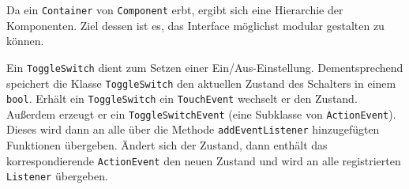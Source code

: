 		Da ein \texttt{Container} von \texttt{Component} erbt, ergibt sich eine Hierarchie der Komponenten. Ziel dessen ist es, das Interface möglichst modular gestalten zu können.
		
		
		\medskip
		\begin{figure}
			\label{uml-toggleswitch}
		\end{figure}
		Ein \texttt{ToggleSwitch} dient zum Setzen einer Ein/Aus-Einstellung.
		Dementsprechend speichert die Klasse \texttt{ToggleSwitch} den aktuellen Zustand des Schalters in einem \texttt{bool}.
		Erhält ein \texttt{ToggleSwitch} ein \texttt{TouchEvent} wechselt er den Zustand.
		Außerdem erzeugt er ein \texttt{ToggleSwitchEvent} (eine Subklasse von \texttt{ActionEvent}).
		Dieses wird dann an alle über die Methode \texttt{addEventListener} hinzugefügten Funktionen übergeben.
		Ändert sich der Zustand, dann enthält das korrespondierende \texttt{ActionEvent} den neuen Zustand und wird an alle registrierten \texttt{Listener} übergeben.
		
